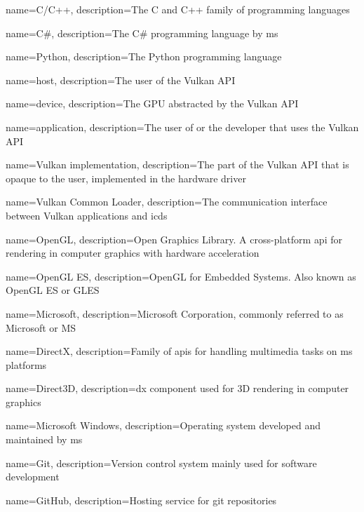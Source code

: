 {
  name={C/C++},
  description={The C and C++ family of programming languages}
}

{
  name={C\#},
  description={The C\# programming language by \gls{ms}}
}

{
  name={Python},
  description={The Python programming language}
}

{
  name={host},
  description={The user of the Vulkan API}
}

{
  name={device},
  description={The GPU abstracted by the Vulkan API}
}

{
  name={application},
  description={The user of or the developer that uses the Vulkan API}
}

{
  name={Vulkan implementation},
  description={The part of the Vulkan API that is opaque to the user, implemented in the hardware driver}
}

{
  name={Vulkan Common Loader},
  description={The communication interface between Vulkan applications and \glspl{icd}}
}

{
  name={OpenGL},
  description={Open Graphics Library. A cross-platform \gls{api} for rendering in computer graphics with hardware acceleration}
}

{
  name={OpenGL ES},
  description={OpenGL for Embedded Systems. Also known as OpenGL ES or GLES}
}

{
  name={Microsoft},
  description={Microsoft Corporation, commonly referred to as Microsoft or MS}
}

{
  name={DirectX},
  description={Family of \glspl{api} for handling multimedia tasks on \gls{ms} platforms}
}

{
  name={Direct3D},
  description={\gls{dx} component used for 3D rendering in computer graphics}
}

{
  name={Microsoft Windows},
  description={Operating system developed and maintained by \gls{ms}}
}

{
  name={Git},
  description={Version control system mainly used for software development}
}

{
  name={GitHub},
  description={Hosting service for \gls{git} repositories}
}

